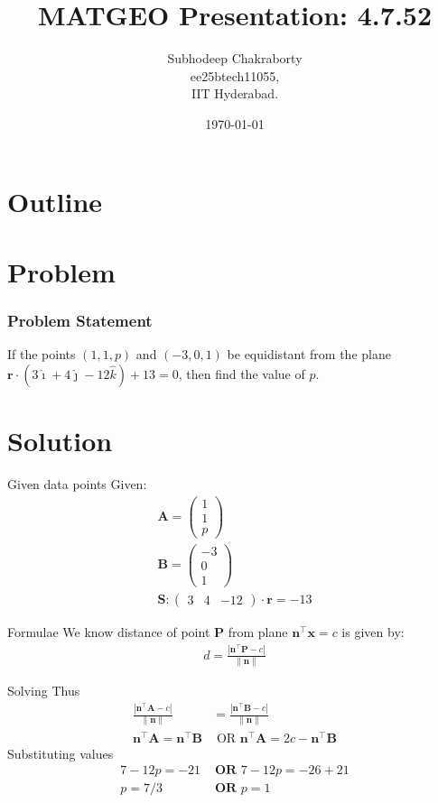 \documentclass{beamer}
\title{MATGEO Presentation: 4.7.52}
\author{Subhodeep Chakraborty \\ ee25btech11055,\\IIT Hyderabad.}
\date{\today}
\providecommand{\brak}[1]{\ensuremath{\left(#1\right)}}
\theoremstyle{remark}
\providecommand{\norm}[1]{\lVert#1\rVert}
\newcommand{\myvec}[1]{\ensuremath{\begin{pmatrix}#1\end{pmatrix}}}
\let\vec\mathbf
\numberwithin{equation}{section}
\begin{document}
\begin{frame}
\titlepage
\end{frame}

\section*{Outline}
\begin{frame}
\tableofcontents
\end{frame}

\section{Problem}
\begin{frame}
\frametitle{Problem Statement}

If the points \brak{1, 1, p} and \brak{-3, 0, 1} be equidistant from the plane $\vec{r}\cdot\brak{3\hat{\imath} + 4\hat{\jmath} -12\hat{k}}+13=0$, then find the value of $p$.

\end{frame}

\section{Solution}
\begin{frame}{Given data points}
Given:
\begin{align}
 \vec{A} = \myvec{1 \\ 1 \\ p} \\
 \vec{B} = \myvec{-3 \\ 0 \\1 } \\
 \vec{S}: \myvec{3 & 4 & -12}\cdot\vec{r} = -13
\end{align}
\end{frame}

\begin{frame}{Formulae}
We know distance of point $\vec{P}$ from plane $\vec{n}^\top\vec{x}=c$ is given by:
\begin{align}
 d = \frac{|\vec{n}^\top\vec{P}-c|}{\norm{\vec{n}}}
\end{align}
\end{frame}

\begin{frame}{Solving}
Thus
\begin{align}
 \frac{|\vec{n}^\top\vec{A}-c|}{\norm{\vec{n}}} &= \frac{|\vec{n}^\top\vec{B}-c|}{\norm{\vec{n}}} \\
 \vec{n}^\top\vec{A} = \vec{n}^\top\vec{B} &\text{ OR } \vec{n}^\top\vec{A} = 2c - \vec{n}^\top\vec{B}
\end{align}
Substituting values
\begin{align}
7 - 12p = -21 &\textbf{  OR  } 7-12p = -26 + 21 \\
p = 7/3 &\textbf{  OR  } p = 1
\end{align}
\end{frame}
\end{document}
